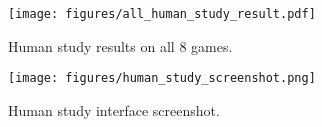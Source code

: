 \documentclass{article}
\theoremstyle{plain}
\theoremstyle{definition}
\theoremstyle{remark}
\begin{document}

\begin{figure}
  \centering
   \caption{Human study results on all 8 games.}
       \vspace{2em}
  \texttt{[image: figures/all\_human\_study\_result.pdf]}
  \label{fig:all_human_study_result}
\end{figure}

\begin{figure}
  \centering
  \texttt{[image: figures/human\_study\_screenshot.png]}
   \caption{Human study interface screenshot.}
  \label{fig:human_study_interface}
\end{figure}
 
\end{document}
